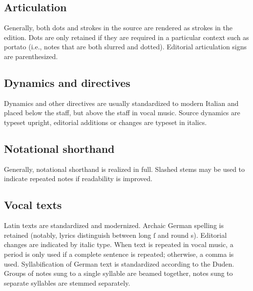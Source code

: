 \documentclass[abbrwidth=7em,shorttitlesize=55]{ees}
\begin{document}
\subsection{Articulation}

Generally, both dots and strokes in the source are rendered as strokes in the edition. Dots are only retained if they are required in a particular context such as portato (i.e., notes that are both slurred and dotted). Editorial articulation signs are parenthesized.


\subsection{Dynamics and directives}

Dynamics and other directives are usually standardized to modern Italian and placed below the staff, but above the staff in vocal music. Source dynamics are typeset upright, editorial additions or changes are typeset in italics.


\subsection{Notational shorthand}

Generally, notational shorthand is realized in full. Slashed stems may be used to indicate repeated notes if readability is improved.


\subsection{Vocal texts}

Latin texts are standardized and modernized. Archaic German spelling is retained (notably, lyrics distinguish between long ſ and round s). Editorial changes are indicated by italic type. When text is repeated in vocal music, a period is only used if a complete sentence is repeated; otherwise, a comma is used. Syllabification of German text is standardized according to the Duden. Groups of notes sung to a single syllable are beamed together, notes sung to separate syllables are stemmed separately.

\cleardoublepage%
%
\setcounter{page}{1}%
%

\cleardoublepage
%

\cleardoublepage
%
\end{document}
